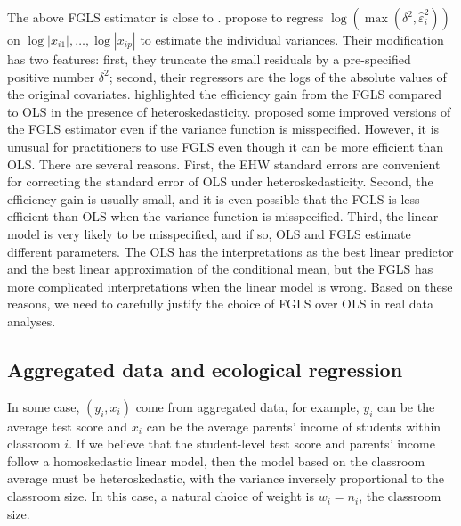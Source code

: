 The above FGLS estimator is close to \citet[][Chapter 8]{wooldridge2012introductory}. \citet{romano2017resurrecting} propose to regress $\log ( \max(\delta^2, \hat \varepsilon_i^2) )$ on $ \log | x_{i1} |, \ldots, \log  |x_{ip}|$ to estimate the individual variances. Their modification has two features: first, they truncate the small residuals by a pre-specified positive number $\delta^2$; second, their regressors are the logs of the absolute values of the original covariates. 
\citet{romano2017resurrecting} highlighted the efficiency gain from the FGLS compared to OLS in the presence of heteroskedasticity. 
\citet{diciccio2019improving} proposed some improved versions of the FGLS estimator even if the variance function is misspecified. However, it is unusual for practitioners to use FGLS even though it can be more efficient than OLS. There are several reasons. First, the EHW standard errors are convenient for correcting the standard error of OLS under heteroskedasticity. Second, the efficiency gain is usually small, and it is even possible that the FGLS is less efficient than OLS when the variance function is misspecified. Third, the linear model is very likely to be misspecified, and if so, OLS and FGLS estimate different parameters. The OLS has the interpretations as the best linear predictor and the best linear approximation of the conditional mean, but the FGLS has more complicated interpretations when the linear model is wrong. Based on these reasons, we need to carefully justify the choice of FGLS  over  OLS in real data analyses. 
 


\subsection{Aggregated data and ecological regression}
\label{sec::regression-aggregateddata}



In some case, $(y_{i},x_{i})$ come from aggregated data, for example,
$y_{i}$ can be the average test score and $x_{i}$ can be the average
parents' income of students within classroom $i$. If we believe that
the student-level test score and parents' income follow a homoskedastic
linear model, then the model based on the classroom average must be
heteroskedastic, with the variance inversely proportional to the
classroom size. In this case, a natural choice of weight is $w_{i}=n_{i}$,
the classroom size. 



